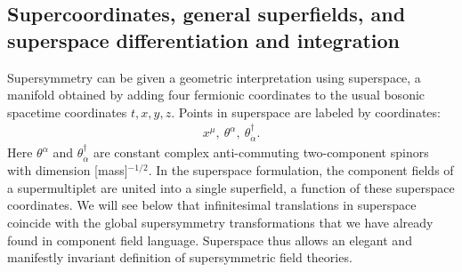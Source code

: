 \documentclass[11pt]{article}
\def\beq{\begin{eqnarray}}
\def\eeq{\end{eqnarray}}
\begin{document}
\subsection{Supercoordinates, general superfields, and 
superspace differentiation and integration\label{subsec:supercoordinates}}
\setcounter{footnote}{2}
\setcounter{equation}{0}

Supersymmetry can be given a geometric interpretation using superspace,
a manifold obtained by adding four fermionic coordinates to the usual bosonic spacetime coordinates
$t,x,y,z$. Points in superspace are labeled by coordinates:
\beq
x^\mu,\> \theta^\alpha,\> \theta^\dagger_{\dot\alpha}.
\label{eq:supercoordinates}
\eeq
Here $\theta^\alpha$ and $\theta^\dagger_{\dot\alpha}$ 
are constant complex anti-commuting two-component spinors with dimension
[mass]$^{-1/2}$. In the superspace formulation, the component fields of 
a supermultiplet
are united into a single superfield, a function of these superspace coordinates. 
We will see below that infinitesimal translations in superspace coincide with the 
global supersymmetry transformations that we have already found in component field language. Superspace thus allows an elegant and 
manifestly invariant definition of supersymmetric field theories.
\end{document}
